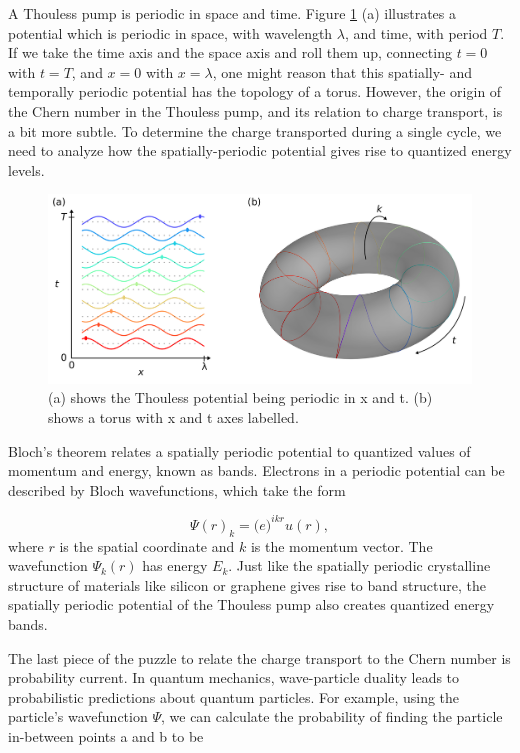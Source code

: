 \documentclass[double,12pt,1in]{beavtex}
\begin{document}
A Thouless pump is periodic in space and time. Figure \ref{thouless pump torus} (a) illustrates a potential which is periodic in space, with wavelength $\lambda$, and time, with period $T$. If we take the time axis and the space axis and roll them up, connecting $t = 0$ with $t = T$, and $x = 0$ with $x = \lambda$, one might reason that this spatially- and temporally periodic potential has the topology of a torus. However, the origin of the Chern number in the Thouless pump, and its relation to charge transport, is a bit more subtle. To determine the charge transported during a single cycle, we need to analyze how the spatially-periodic potential gives rise to quantized energy levels.

\begin{figure}
    \includegraphics{Thouless pump fig.png}
    \caption{(a) shows the Thouless potential being periodic in x and t. (b) shows a torus with x and t axes labelled.}
    \label{thouless pump torus}
\end{figure}

Bloch's theorem relates a spatially periodic potential to quantized values of momentum and energy, known as bands. Electrons in a periodic potential can be described by Bloch wavefunctions, which take the form

\begin{equation}
    \Psi(r)_k = \mathrm(e)^{ikr}u(r), \label{Bloch's theorem}
\end{equation}
where $r$ is the spatial coordinate and $k$ is the momentum vector. The wavefunction $\Psi_k(r)$ has energy $E_k$. Just like the spatially periodic crystalline structure of materials like silicon or graphene gives rise to band structure, the spatially periodic potential of the Thouless pump also creates quantized energy bands.

The last piece of the puzzle to relate the charge transport to the Chern number is probability current. In quantum mechanics, wave-particle duality leads to probabilistic predictions about quantum particles. For example, using the particle's wavefunction $\Psi$, we can calculate the probability of finding the particle in-between points a and b to be 
\end{document}
